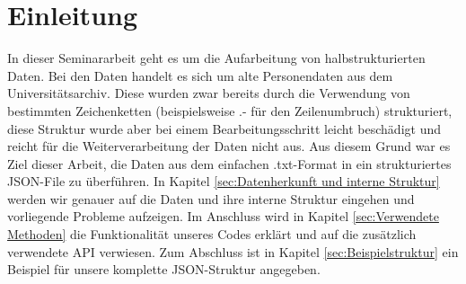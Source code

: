 \section{Einleitung}
 \label{sec:Einleitung}

In dieser Seminararbeit geht es um die Aufarbeitung von halbstrukturierten Daten. Bei den Daten handelt es sich um alte Personendaten aus dem Universitätsarchiv. Diese wurden zwar bereits durch die Verwendung von bestimmten Zeichenketten (beispielsweise .- für den Zeilenumbruch) strukturiert, diese Struktur wurde aber bei einem Bearbeitungsschritt leicht beschädigt und reicht für die Weiterverarbeitung der Daten nicht aus. Aus diesem Grund war es Ziel dieser Arbeit, die Daten aus dem einfachen .txt-Format in ein strukturiertes JSON-File zu überführen. In Kapitel \ref{sec:Datenherkunft und interne Struktur} werden wir genauer auf die Daten und ihre interne Struktur eingehen und vorliegende Probleme aufzeigen. Im Anschluss wird in Kapitel \ref{sec:Verwendete Methoden} die Funktionalität unseres Codes erklärt und auf die zusätzlich verwendete API verwiesen. Zum Abschluss ist in Kapitel \ref{sec:Beispielstruktur} ein Beispiel für unsere komplette JSON-Struktur angegeben.